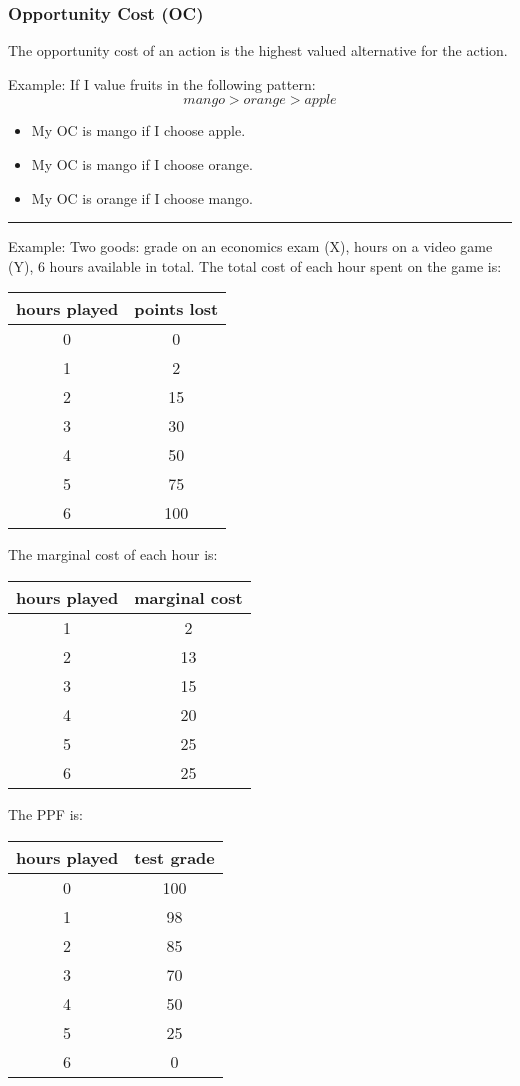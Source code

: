 \documentclass[letterpaper, 12pt]{article}
\begin{document}
\subsubsection{Opportunity Cost (OC)}
The opportunity cost of an action is the highest valued alternative for
the action.

Example: If I value fruits in the following pattern:
\[ mango > orange > apple \]
\begin{itemize}
  \item My OC is mango if I choose apple.
  \item My OC is mango if I choose orange.
  \item My OC is orange if I choose mango.
\end{itemize}

\noindent\rule{13.7cm}{0.4pt}

Example: Two goods: grade on an economics exam (X), hours on a video game (Y),
6 hours available in total. The total cost of each hour spent on the game
is:
\begin{center}
  \begin{tabular}{|c|c|}
    \hline
    hours played & points lost \\ \hline
    0 & 0 \\ \hline
    1 & 2 \\ \hline
    2 & 15 \\ \hline
    3 & 30 \\ \hline
    4 & 50 \\ \hline
    5 & 75 \\ \hline
    6 & 100 \\ \hline
  \end{tabular}
\end{center}

The marginal cost of each hour is:
\begin{center}
  \begin{tabular}{|c|c|}
    \hline
    hours played & marginal cost \\ \hline
    1 & 2 \\ \hline
    2 & 13 \\ \hline
    3 & 15 \\ \hline
    4 & 20 \\ \hline
    5 & 25 \\ \hline
    6 & 25 \\ \hline
  \end{tabular}
\end{center}

The PPF is:
\begin{center}
  \begin{tabular}{|c|c|}
    \hline
    hours played & test grade \\ \hline
    0 & 100 \\ \hline
    1 & 98 \\ \hline
    2 & 85 \\ \hline
    3 & 70 \\ \hline
    4 & 50 \\ \hline
    5 & 25 \\ \hline
    6 & 0 \\ \hline
  \end{tabular}
\end{center}
\end{document}
